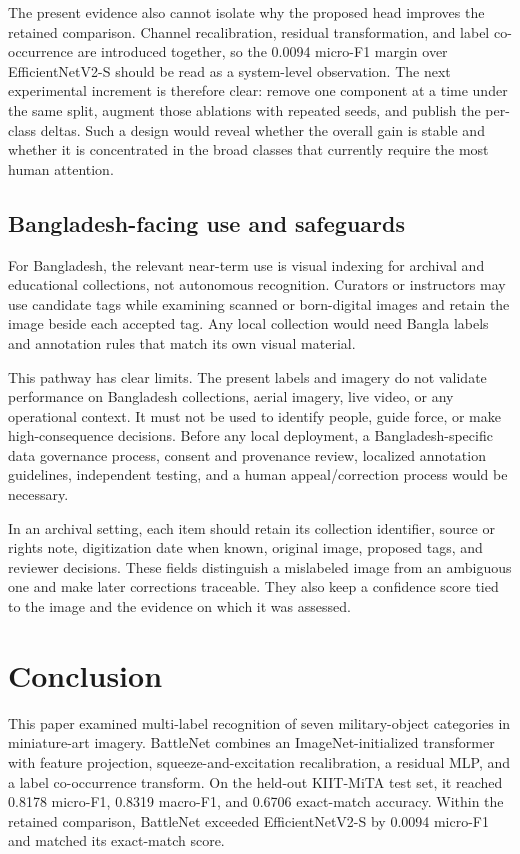 \documentclass[conference]{IEEEtran}
\begin{document}
The present evidence also cannot isolate why the proposed head improves the retained comparison. Channel recalibration, residual transformation, and label co-occurrence are introduced together, so the 0.0094 micro-F1 margin over EfficientNetV2-S should be read as a system-level observation. The next experimental increment is therefore clear: remove one component at a time under the same split, augment those ablations with repeated seeds, and publish the per-class deltas. Such a design would reveal whether the overall gain is stable and whether it is concentrated in the broad classes that currently require the most human attention.

\subsection{Bangladesh-facing use and safeguards}
For Bangladesh, the relevant near-term use is visual indexing for archival and educational collections, not autonomous recognition. Curators or instructors may use candidate tags while examining scanned or born-digital images and retain the image beside each accepted tag. Any local collection would need Bangla labels and annotation rules that match its own visual material.

This pathway has clear limits. The present labels and imagery do not validate performance on Bangladesh collections, aerial imagery, live video, or any operational context. It must not be used to identify people, guide force, or make high-consequence decisions. Before any local deployment, a Bangladesh-specific data governance process, consent and provenance review, localized annotation guidelines, independent testing, and a human appeal/correction process would be necessary.

In an archival setting, each item should retain its collection identifier, source or rights note, digitization date when known, original image, proposed tags, and reviewer decisions. These fields distinguish a mislabeled image from an ambiguous one and make later corrections traceable. They also keep a confidence score tied to the image and the evidence on which it was assessed.

\section{Conclusion}
This paper examined multi-label recognition of seven military-object categories in miniature-art imagery. BattleNet combines an ImageNet-initialized transformer with feature projection, squeeze-and-excitation recalibration, a residual MLP, and a label co-occurrence transform. On the held-out KIIT-MiTA test set, it reached 0.8178 micro-F1, 0.8319 macro-F1, and 0.6706 exact-match accuracy. Within the retained comparison, BattleNet exceeded EfficientNetV2-S by 0.0094 micro-F1 and matched its exact-match score.
\end{document}
